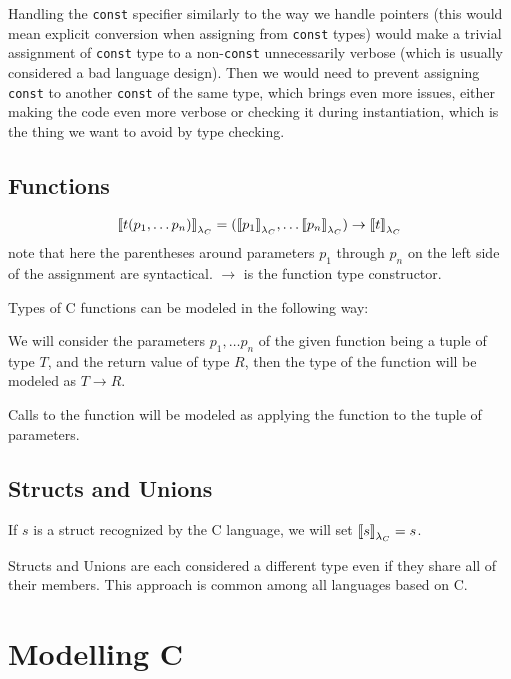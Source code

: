 Handling the \lstinline{const} specifier similarly to the way we handle pointers (this would mean explicit conversion when assigning from \lstinline{const} types) would make a trivial assignment of \lstinline{const} type to a non-\lstinline{const} unnecessarily verbose (which is usually considered a bad language design). Then we would need to prevent assigning \lstinline{const} to another \lstinline{const} of the same type, which brings even more issues, either making the code even more verbose or checking it during instantiation, which is the thing we want to avoid by type checking.

\subsection{Functions}

\begin{defn}
    $${\llbracket t(p_1, \dots p_n) \rrbracket}_{\lambda_C} = ({\llbracket p_1 \rrbracket}_{\lambda_C}, \dots {\llbracket p_n \rrbracket}_{\lambda_C}) \rightarrow {\llbracket t \rrbracket}_{\lambda_C}$$
    note that here the parentheses around parameters $p_1$ through $p_n$ on the left side of the assignment are syntactical. $\rightarrow$ is the function type constructor.
\end{defn}

Types of C functions can be modeled in the following way:

We will consider the parameters $p_1, \dots p_n$ of the given function being a tuple of type $T$, and the return value of type $R$, then the type of the function will be modeled as $T \rightarrow R$.

Calls to the function will be modeled as applying the function to the tuple of parameters.

\subsection{Structs and Unions}

\begin{defn}
    If $s$ is a struct recognized by the C language, we will set ${\llbracket s \rrbracket}_{\lambda_C} = s$.
\end{defn}

Structs and Unions are each considered a different type even if they share all of their members. This approach is common among all languages based on C.

\section{Modelling C}

